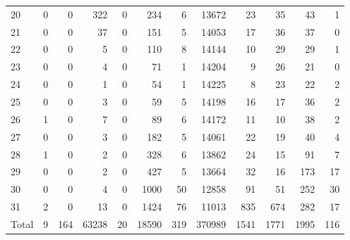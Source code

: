 \begin{table}
\begin{tabular}{lrrrrrrrrrrr}
20 & 0 & 0 & 322 & 0 & 234 & 6 & 13672 & 23 & 35 & 43 & 1 \\
21 & 0 & 0 & 37 & 0 & 151 & 5 & 14053 & 17 & 36 & 37 & 0 \\
22 & 0 & 0 & 5 & 0 & 110 & 8 & 14144 & 10 & 29 & 29 & 1 \\
23 & 0 & 0 & 4 & 0 & 71 & 1 & 14204 & 9 & 26 & 21 & 0 \\
24 & 0 & 0 & 1 & 0 & 54 & 1 & 14225 & 8 & 23 & 22 & 2 \\
25 & 0 & 0 & 3 & 0 & 59 & 5 & 14198 & 16 & 17 & 36 & 2 \\
26 & 1 & 0 & 7 & 0 & 89 & 6 & 14172 & 11 & 10 & 38 & 2 \\
27 & 0 & 0 & 3 & 0 & 182 & 5 & 14061 & 22 & 19 & 40 & 4 \\
28 & 1 & 0 & 2 & 0 & 328 & 6 & 13862 & 24 & 15 & 91 & 7 \\
29 & 0 & 0 & 2 & 0 & 427 & 5 & 13664 & 32 & 16 & 173 & 17 \\
30 & 0 & 0 & 4 & 0 & 1000 & 50 & 12858 & 91 & 51 & 252 & 30 \\
31 & 2 & 0 & 13 & 0 & 1424 & 76 & 11013 & 835 & 674 & 282 & 17 \\
Total & 9 & 164 & 63238 & 20 & 18590 & 319 & 370989 & 1541 & 1771 & 1995 & 116 \\
\end{tabular}
\end{table}
